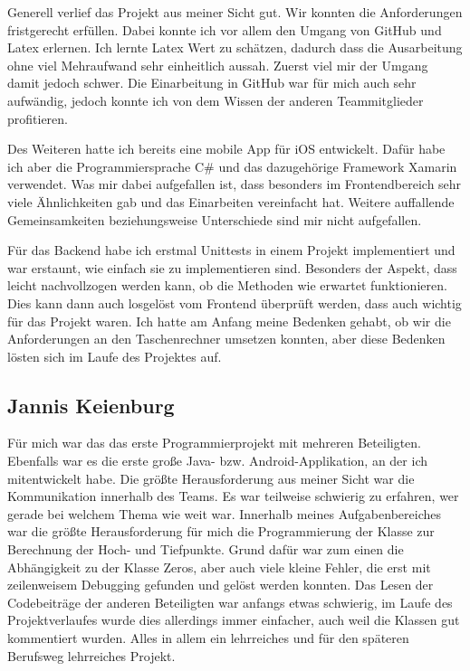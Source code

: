 Generell verlief das Projekt aus meiner Sicht gut. Wir konnten die Anforderungen fristgerecht erfüllen. Dabei konnte ich vor allem den Umgang von GitHub und Latex erlernen. Ich lernte Latex Wert zu schätzen, dadurch dass die Ausarbeitung ohne viel Mehraufwand sehr einheitlich aussah. Zuerst viel mir der Umgang damit jedoch schwer. Die Einarbeitung in GitHub war für mich auch sehr aufwändig, jedoch konnte ich von dem Wissen der anderen Teammitglieder profitieren. 

Des Weiteren hatte ich bereits eine mobile App für iOS entwickelt. Dafür habe ich aber die Programmiersprache C\# und das dazugehörige Framework Xamarin verwendet. Was mir dabei aufgefallen ist, dass besonders im Frontendbereich sehr viele Ähnlichkeiten gab und das Einarbeiten vereinfacht hat. Weitere auffallende Gemeinsamkeiten beziehungsweise Unterschiede sind mir nicht aufgefallen. 

Für das Backend habe ich erstmal Unittests in einem Projekt implementiert und war erstaunt, wie einfach sie zu implementieren sind. Besonders der Aspekt, dass leicht nachvollzogen werden kann, ob die Methoden wie erwartet funktionieren. Dies kann dann auch losgelöst vom Frontend überprüft werden, dass auch wichtig für das Projekt waren.
Ich hatte am Anfang meine Bedenken gehabt, ob wir die Anforderungen an den Taschenrechner umsetzen konnten, aber diese Bedenken lösten sich im Laufe des Projektes auf.


\subsection{Jannis Keienburg}
Für mich war das das erste Programmierprojekt mit mehreren Beteiligten. Ebenfalls war es die erste große Java- bzw. Android-Applikation, an der ich mitentwickelt habe. Die größte Herausforderung aus meiner Sicht war die Kommunikation innerhalb des Teams. Es war teilweise schwierig zu erfahren, wer gerade bei welchem Thema wie weit war. Innerhalb meines Aufgabenbereiches war die größte Herausforderung für mich die Programmierung der Klasse zur Berechnung der Hoch- und Tiefpunkte. Grund dafür war zum einen die Abhängigkeit zu der Klasse Zeros, aber auch viele kleine Fehler, die erst mit zeilenweisem Debugging gefunden und gelöst werden konnten. Das Lesen der Codebeiträge der anderen Beteiligten war anfangs etwas schwierig, im Laufe des Projektverlaufes wurde dies allerdings immer einfacher, auch weil die Klassen gut kommentiert wurden. Alles in allem ein lehrreiches und für den späteren Berufsweg lehrreiches Projekt.

